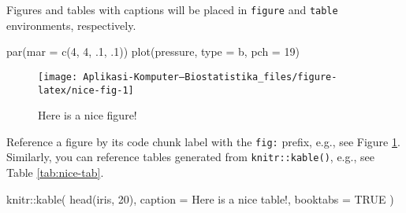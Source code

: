 \documentclass[
]{book}
\newenvironment{Shaded}{\begin{snugshade}}{\end{snugshade}}
\newcommand{\AttributeTok}[1]{\textcolor[rgb]{0.77,0.63,0.00}{#1}}
\newcommand{\ConstantTok}[1]{\textcolor[rgb]{0.00,0.00,0.00}{#1}}
\newcommand{\DecValTok}[1]{\textcolor[rgb]{0.00,0.00,0.81}{#1}}
\newcommand{\FunctionTok}[1]{\textcolor[rgb]{0.00,0.00,0.00}{#1}}
\newcommand{\NormalTok}[1]{#1}
\newcommand{\SpecialCharTok}[1]{\textcolor[rgb]{0.00,0.00,0.00}{#1}}
\newcommand{\StringTok}[1]{\textcolor[rgb]{0.31,0.60,0.02}{#1}}
\begin{document}
Figures and tables with captions will be placed in \texttt{figure} and \texttt{table} environments, respectively.

\begin{Shaded}
\begin{Highlighting}[]
\FunctionTok{par}\NormalTok{(}\AttributeTok{mar =} \FunctionTok{c}\NormalTok{(}\DecValTok{4}\NormalTok{, }\DecValTok{4}\NormalTok{, .}\DecValTok{1}\NormalTok{, .}\DecValTok{1}\NormalTok{))}
\FunctionTok{plot}\NormalTok{(pressure, }\AttributeTok{type =} \StringTok{\textquotesingle{}b\textquotesingle{}}\NormalTok{, }\AttributeTok{pch =} \DecValTok{19}\NormalTok{)}
\end{Highlighting}
\end{Shaded}

\begin{figure}

{\centering \texttt{[image: Aplikasi-Komputer---Biostatistika\_files/figure-latex/nice-fig-1]} 

}

\caption{Here is a nice figure!}\label{fig:nice-fig}
\end{figure}

Reference a figure by its code chunk label with the \texttt{fig:} prefix, e.g., see Figure \ref{fig:nice-fig}. Similarly, you can reference tables generated from \texttt{knitr::kable()}, e.g., see Table \ref{tab:nice-tab}.

\begin{Shaded}
\begin{Highlighting}[]
\NormalTok{knitr}\SpecialCharTok{::}\FunctionTok{kable}\NormalTok{(}
  \FunctionTok{head}\NormalTok{(iris, }\DecValTok{20}\NormalTok{), }\AttributeTok{caption =} \StringTok{\textquotesingle{}Here is a nice table!\textquotesingle{}}\NormalTok{,}
  \AttributeTok{booktabs =} \ConstantTok{TRUE}
\NormalTok{)}
\end{Highlighting}
\end{Shaded}
\end{document}
